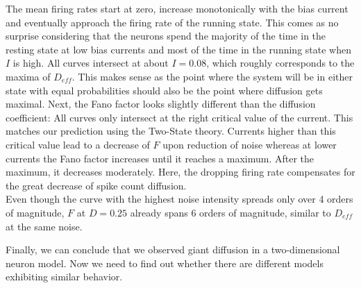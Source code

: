 \documentclass[12pt,a4paper]{article}
\begin{document}
The mean firing rates start at zero, increase monotonically with the bias current and eventually approach the firing rate of the running state. This comes as no surprise considering that the neurons spend the majority of the time in the resting state at low bias currents and most of the time in the running state when $I$ is high. All curves intersect at about $I=0.08$, which roughly corresponds to the maxima of $D_{eff}$. This makes sense as the point where the system will be in either state with equal probabilities should also be the point where diffusion gets maximal.
Next, the Fano factor looks slightly different than the diffusion coefficient: All curves only intersect at the right critical value of the current. This matches our prediction using the Two-State theory. Currents higher than this critical value lead to a decrease of $F$ upon reduction of noise whereas at lower currents the Fano factor increases until it reaches a maximum. After the maximum, it decreases moderately. Here, the dropping firing rate compensates for the great decrease of spike count diffusion. \\
Even though the curve with the highest noise intensity spreads only over 4 orders of magnitude, $F$ at $D=0.25$ already spans  6 orders of magnitude, similar to $D_{eff}$ at the same noise. 

Finally, we can conclude that we observed giant diffusion in a two-dimensional neuron model. Now we need to find out whether there are different models exhibiting similar behavior.
\end{document}
